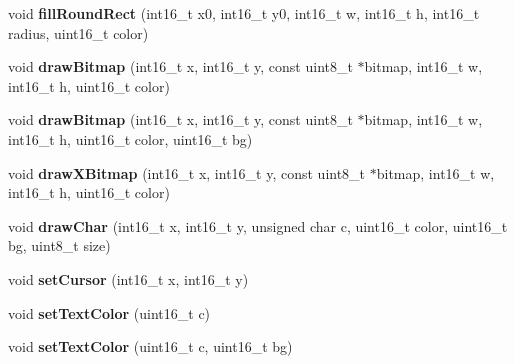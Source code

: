 \begin{DoxyCompactItemize}
\item 
\hypertarget{class_adafruit___g_f_x_a78dc59f6a508bcd3d5ac7af957b8b1ac}{}void {\bfseries fill\+Round\+Rect} (int16\+\_\+t x0, int16\+\_\+t y0, int16\+\_\+t w, int16\+\_\+t h, int16\+\_\+t radius, uint16\+\_\+t color)\label{class_adafruit___g_f_x_a78dc59f6a508bcd3d5ac7af957b8b1ac}

\item 
\hypertarget{class_adafruit___g_f_x_a50bf54503493152eeefa36f9768acec2}{}void {\bfseries draw\+Bitmap} (int16\+\_\+t x, int16\+\_\+t y, const uint8\+\_\+t $\ast$bitmap, int16\+\_\+t w, int16\+\_\+t h, uint16\+\_\+t color)\label{class_adafruit___g_f_x_a50bf54503493152eeefa36f9768acec2}

\item 
\hypertarget{class_adafruit___g_f_x_a5225478b3f2afefcb16ed03e9fe93dc0}{}void {\bfseries draw\+Bitmap} (int16\+\_\+t x, int16\+\_\+t y, const uint8\+\_\+t $\ast$bitmap, int16\+\_\+t w, int16\+\_\+t h, uint16\+\_\+t color, uint16\+\_\+t bg)\label{class_adafruit___g_f_x_a5225478b3f2afefcb16ed03e9fe93dc0}

\item 
\hypertarget{class_adafruit___g_f_x_acec26bcf41c15ac6826c67e1f5e4cde6}{}void {\bfseries draw\+X\+Bitmap} (int16\+\_\+t x, int16\+\_\+t y, const uint8\+\_\+t $\ast$bitmap, int16\+\_\+t w, int16\+\_\+t h, uint16\+\_\+t color)\label{class_adafruit___g_f_x_acec26bcf41c15ac6826c67e1f5e4cde6}

\item 
\hypertarget{class_adafruit___g_f_x_ab7f5a29b3a3dffe30c6a3f4c1f604a5a}{}void {\bfseries draw\+Char} (int16\+\_\+t x, int16\+\_\+t y, unsigned char c, uint16\+\_\+t color, uint16\+\_\+t bg, uint8\+\_\+t size)\label{class_adafruit___g_f_x_ab7f5a29b3a3dffe30c6a3f4c1f604a5a}

\item 
\hypertarget{class_adafruit___g_f_x_aaf96a40cad0f34dd8ec73494b3866c33}{}void {\bfseries set\+Cursor} (int16\+\_\+t x, int16\+\_\+t y)\label{class_adafruit___g_f_x_aaf96a40cad0f34dd8ec73494b3866c33}

\item 
\hypertarget{class_adafruit___g_f_x_a59178a0e0c845a14a39b457c43567dd9}{}void {\bfseries set\+Text\+Color} (uint16\+\_\+t c)\label{class_adafruit___g_f_x_a59178a0e0c845a14a39b457c43567dd9}

\item 
\hypertarget{class_adafruit___g_f_x_ab6e88c585d3ab6b4f95199361f224fc6}{}void {\bfseries set\+Text\+Color} (uint16\+\_\+t c, uint16\+\_\+t bg)\label{class_adafruit___g_f_x_ab6e88c585d3ab6b4f95199361f224fc6}


\end{DoxyCompactItemize}
